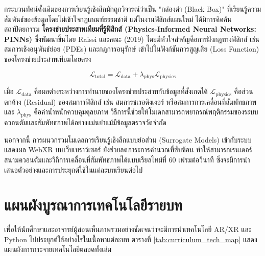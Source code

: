 กระบวนทัศน์ดั้งเดิมของการเรียนรู้เชิงลึกมักถูกวิจารณ์ว่าเป็น "กล่องดำ (Black Box)" ที่เรียนรู้ความสัมพันธ์ของข้อมูลโดยไม่เข้าใจกฎเกณฑ์ธรรมชาติ แต่ในงานฟิสิกส์แผนใหม่ ได้มีการคิดค้นสถาปัตยกรรม \textbf{โครงข่ายประสาทเทียมที่รู้ฟิสิกส์ (Physics-Informed Neural Networks: PINNs)} ซึ่งพัฒนาขึ้นโดย Raissi และคณะ (2019) โดยมีหัวใจสำคัญคือการฝังกฎทางฟิสิกส์ เช่น สมการเชิงอนุพันธ์ย่อย (PDEs) และกฎการอนุรักษ์ เข้าไปในฟังก์ชันการสูญเสีย (Loss Function) ของโครงข่ายประสาทเทียมโดยตรง

\begin{equation}
\mathcal{L}_{\text{total}} = \mathcal{L}_{\text{data}} + \lambda_{\text{phys}} \mathcal{L}_{\text{physics}}
\end{equation}

เมื่อ $\mathcal{L}_{\text{data}}$ คือผลต่างระหว่างการทำนายของโครงข่ายประสาทกับข้อมูลที่สังเกตได้ $\mathcal{L}_{\text{physics}}$ คือส่วนตกค้าง (Residual) ของสมการฟิสิกส์ เช่น สมการชเรอดิงเงอร์ หรือสมการการเคลื่อนที่สัมพัทธภาพ และ $\lambda_{\text{phys}}$ คือค่าน้ำหนักควบคุมดุลยภาพ วิธีการนี้ช่วยให้โมเดลสามารถพยากรณ์พฤติกรรมของระบบควอนตัมและสัมพัทธภาพได้อย่างแม่นยำแม้มีข้อมูลตรวจวัดจำกัด

นอกจากนี้ การผนวกรวมโมเดลการเรียนรู้เชิงลึกแบบย่อส่วน (Surrogate Models) เข้ากับระบบแสดงผล WebXR บนเว็บเบราว์เซอร์ ยังช่วยลดภาระการคำนวณที่ซับซ้อน ทำให้สามารถเรนเดอร์สนามควอนตัมและวิถีการเคลื่อนที่สัมพัทธภาพได้แบบเรียลไทม์ที่ 60 เฟรมต่อวินาที ซึ่งจะมีการนำเสนอตัวอย่างและการประยุกต์ใช้ในแต่ละบทเรียนต่อไป

\section{แผนผังบูรณาการเทคโนโลยีรายบท}

เพื่อให้นักศึกษาและอาจารย์ผู้สอนเห็นภาพรวมอย่างชัดเจนว่าจะมีการนำเทคโนโลยี AR/XR และ Python ไปประยุกต์ใช้อย่างไรในเนื้อหาแต่ละบท ตารางที่ \ref{tab:curriculum_tech_map} แสดงแผนผังการกระจายเทคโนโลยีตลอดทั้งเล่ม

